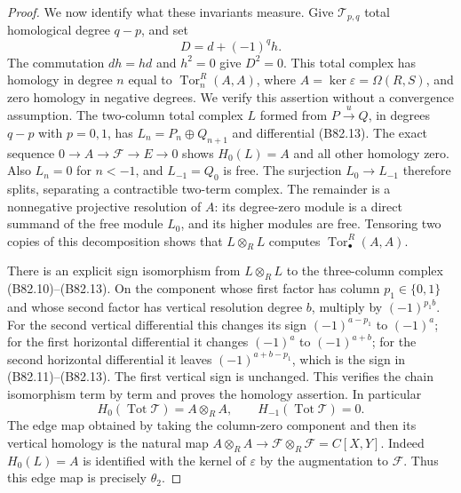 \begin{proof}
We now identify what these invariants measure. Give
$\mathcal T_{p,q}$ total homological degree $q-p$, and set
\[
                      D=d+(-1)^q h.                     \tag{B82.13}
\]
The commutation $dh=hd$ and $h^2=0$ give $D^2=0$.
This total complex has homology in degree $n$ equal to
$\operatorname{Tor}_n^R(A,A)$, where $A=\ker\varepsilon=\Omega(R,S)$,
and zero homology in negative degrees. We verify this assertion
without a convergence assumption. The two-column total complex
$L$ formed from $P\xrightarrow{u}Q$, in degrees $q-p$ with
$p=0,1$, has $L_n=P_n\oplus Q_{n+1}$ and differential (B82.13).
The exact sequence $0\to A\to\mathcal F\to E\to0$ shows
$H_0(L)=A$ and all other homology zero. Also $L_n=0$ for $n<-1$,
and $L_{-1}=Q_0$ is free. The surjection $L_0\to L_{-1}$ therefore
splits, separating a contractible two-term complex. The remainder
is a nonnegative projective resolution of $A$: its degree-zero
module is a direct summand of the free module $L_0$, and its
higher modules are free. Tensoring two copies of this decomposition
shows that $L\otimes_RL$ computes $\operatorname{Tor}_\bullet^R(A,A)$.

There is an explicit sign isomorphism from $L\otimes_RL$ to the
three-column complex (B82.10)--(B82.13). On the component whose
first factor has column $p_1\in\{0,1\}$ and whose second factor
has vertical resolution degree $b$, multiply by $(-1)^{p_1b}$.
For the second vertical differential this changes its sign
$(-1)^{a-p_1}$ to $(-1)^a$; for the first horizontal differential
it changes $(-1)^a$ to $(-1)^{a+b}$; for the second horizontal
differential it leaves $(-1)^{a+b-p_1}$, which is the sign in
(B82.11)--(B82.13). The first vertical sign is unchanged.
This verifies the chain isomorphism term by term and proves the
homology assertion. In particular
\[
                 H_0(\operatorname{Tot}\mathcal T)=A\otimes_RA,
                 \qquad H_{-1}(\operatorname{Tot}\mathcal T)=0.
                                                        \tag{B82.14}
\]
The edge map obtained by taking the column-zero component and
then its vertical homology is the natural map
$A\otimes_RA\to\mathcal F\otimes_R\mathcal F=C[X,Y]$.
Indeed $H_0(L)=A$ is identified with the kernel of $\varepsilon$
by the augmentation to $\mathcal F$. Thus this edge map is
precisely $\theta_2$.


\end{proof}

